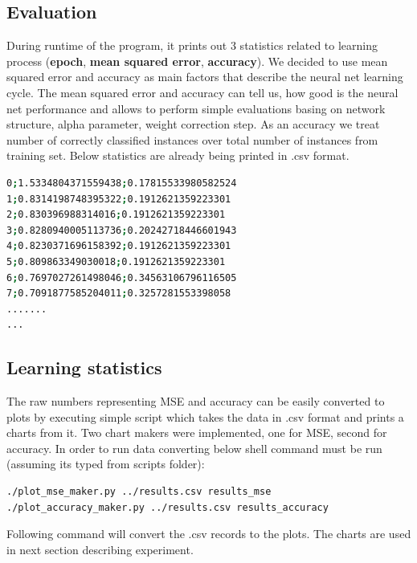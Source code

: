 \documentclass[12pt,a4paper]{article}
\begin{document}
\subsection{Evaluation}
During runtime of the program, it prints out 3 statistics related to learning process (\textbf{epoch}, \textbf{mean squared error}, \textbf{accuracy}). We decided to use mean squared error and accuracy as main factors that describe the neural net learning cycle. The mean squared error and accuracy can tell us, how good is the neural net performance and allows to perform simple evaluations basing on network structure, alpha parameter, weight correction step. As an accuracy we treat number of correctly classified instances over total number of instances from training set. Below statistics are already being printed in .csv format.
\begin{lstlisting}[language=bash]
0;1.5334804371559438;0.17815533980582524
1;0.8314198748395322;0.1912621359223301
2;0.830396988314016;0.1912621359223301
3;0.8280940005113736;0.20242718446601943
4;0.8230371696158392;0.1912621359223301
5;0.809863349030018;0.1912621359223301
6;0.7697027261498046;0.34563106796116505
7;0.7091877585204011;0.3257281553398058
.......
...
\end{lstlisting}

\subsection{Learning statistics}
The raw numbers representing MSE and accuracy can be easily converted to plots by executing simple script which takes the data in .csv format and prints a charts from it. Two chart makers were implemented, one for MSE, second for accuracy. In order to run data converting below shell command must be run (assuming its typed from scripts folder):\\
\begin{lstlisting}[language=bash]
./plot_mse_maker.py ../results.csv results_mse
./plot_accuracy_maker.py ../results.csv results_accuracy
\end{lstlisting}

Following command will convert the .csv records to the plots. The charts are used in next section describing experiment.
\end{document}
